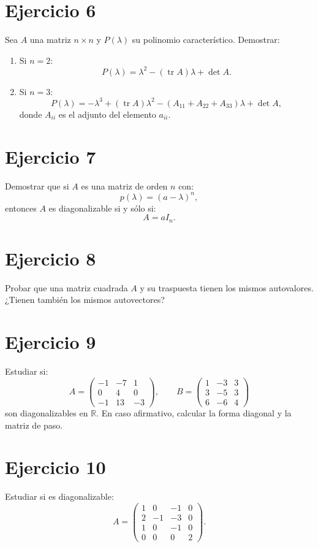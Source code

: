 \documentclass[11pt,a4paper]{article}
\newcommand{\R}{\mathbb{R}}
\newcommand{\tr}{\operatorname{tr}}
\begin{document}
\section{Ejercicio 6}
Sea $A$ una matriz $n\times n$ y $P(\lambda)$ su polinomio característico. Demostrar:
\begin{enumerate}[label=\alph*)]
\item Si $n=2$:
\[
P(\lambda)=\lambda^2-(\tr A)\lambda+\det A.
\]
\item Si $n=3$:
\[
P(\lambda)
=
-\lambda^3
+
(\tr A)\lambda^2
-
(A_{11}+A_{22}+A_{33})\lambda
+
\det A,
\]
donde $A_{ii}$ es el adjunto del elemento $a_{ii}$.
\end{enumerate}

\section{Ejercicio 7}
Demostrar que si $A$ es una matriz de orden $n$ con:
\[
p(\lambda)=(a-\lambda)^n,
\]
entonces $A$ es diagonalizable si y sólo si:
\[
A=aI_n.
\]

\section{Ejercicio 8}
Probar que una matriz cuadrada $A$ y su traspuesta tienen los mismos autovalores. ¿Tienen también los mismos autovectores?

\section{Ejercicio 9}
Estudiar si:
\[
A=
\begin{pmatrix}
-1&-7&1\\
0&4&0\\
-1&13&-3
\end{pmatrix},
\qquad
B=
\begin{pmatrix}
1&-3&3\\
3&-5&3\\
6&-6&4
\end{pmatrix}
\]
son diagonalizables en $\R$. En caso afirmativo, calcular la forma diagonal y la matriz de paso.

\section{Ejercicio 10}
Estudiar si es diagonalizable:
\[
A=
\begin{pmatrix}
1&0&-1&0\\
2&-1&-3&0\\
1&0&-1&0\\
0&0&0&2
\end{pmatrix}.
\]
\end{document}

